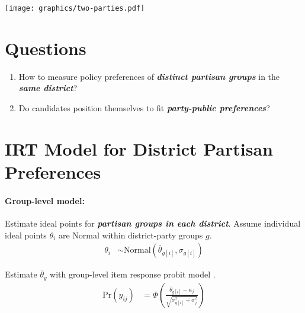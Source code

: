 \documentclass[a0]{a0poster}
\begin{document}
\begin{multicols*}{3}
\vspace{1em}





\begin{center}
  \texttt{[image: graphics/two-parties.pdf]}
\end{center}


\section*{Questions}

\begin{enumerate}
  \item How to measure policy preferences of \textbf{\emph{distinct partisan groups}} in the \emph{\textbf{same district}}?
  \item Do candidates position themselves to fit \emph{\textbf{party-public preferences}}?
\end{enumerate}



\columnbreak



\section*{IRT Model for District Partisan Preferences}

\paragraph{Group-level model:}
Estimate ideal points for \textbf{\emph{partisan groups in each district}}. Assume individual ideal points $\theta_{i}$ are Normal within district-party groups $g$.
\begin{align}
  \theta_{i} &\sim \mathrm{Normal}\left( \bar{\theta}_{g[i]} , \sigma_{g[i]} \right)
\end{align}

Estimate $\bar{\theta}_{g}$ with group-level item response probit model \parencite{caughey-warshaw:2015:DGIRT}.
\begin{align}
  \mathrm{Pr}\left( y_{\mathit{ij}} \right) &= 
    \Phi\left( 
      \frac{
        \bar{\theta}_{g[i]} - \kappa_{j}
      }{
        \sqrt{ \sigma_{g[i]}^{2} + \sigma^{2}_{j} }
      } 
    \right)
\end{align}


\end{multicols*}
\end{document}
